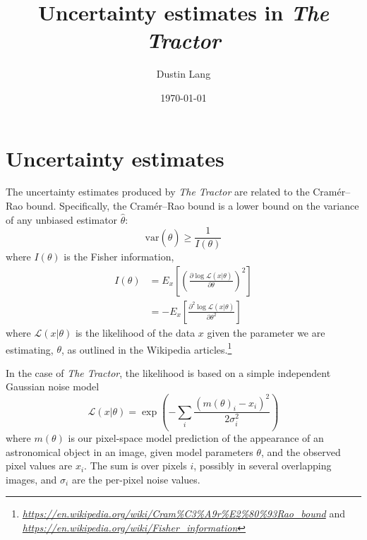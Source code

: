 \documentclass[letterpaper]{article}
\newcommand{\likelihood}{\mathcal{L}}
\newcommand{\dd}{\partial}
\newcommand{\var}{\textrm{var}}
\newcommand{\niceurl}[1]{\mbox{\href{#1}{\textsl{#1}}}}
\begin{document}
\title{Uncertainty estimates in \emph{The Tractor}}
\author{Dustin Lang}
\date{\today}

\maketitle

\section{Uncertainty estimates}

The uncertainty estimates produced by \emph{The Tractor} are related
to the Cram\'er--Rao bound.  Specifically, the Cram\'er--Rao bound is
a lower bound on the variance of any unbiased estimator $\hat{\theta}$:
\begin{equation}
\var(\hat{\theta}) \ge \displaystyle\frac{1}{I(\theta)}
\end{equation}
where $I(\theta)$ is the Fisher information,
\begin{align}
  I(\theta) &= E_{x}\left[ \left( \frac{\dd \log \likelihood(x | \theta)}{\dd \theta} \right)^2 \right] \\
  & = - E_{x}\left[ \frac{\dd^2 \log \likelihood(x | \theta)}{\dd \theta^2} \right]
\end{align}
where $\likelihood(x | \theta)$ is the likelihood of the data $x$ given
the parameter we are estimating, $\theta$,
as outlined in the Wikipedia articles.\footnote{%
  \niceurl{https://en.wikipedia.org/wiki/Cram\%C3\%A9r\%E2\%80\%93Rao\_bound}
  and
  \niceurl{https://en.wikipedia.org/wiki/Fisher\_information}}


In the case of \emph{The Tractor}, the likelihood is based on a simple
independent Gaussian noise model
\begin{equation}
\likelihood(x | \theta) = \exp\left(-\sum_i \frac{(m(\theta)_i - x_i)^2}{2 \sigma_i^2} \right)
\end{equation}
where $m(\theta)$ is our pixel-space model prediction of the
appearance of an astronomical object in an image, given model
parameters $\theta$, and the observed pixel values are $x_i$.  The sum
is over pixels $i$, possibly in several overlapping images, and
$\sigma_i$ are the per-pixel noise values.
\end{document}
